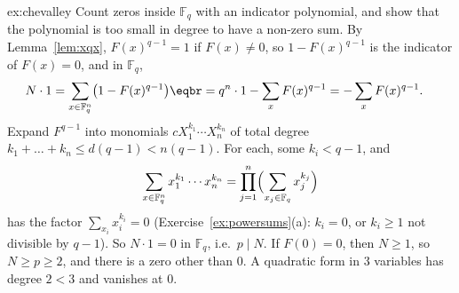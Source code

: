 \begin{solution}{ex:chevalley}
\idea Count zeros inside $\mathbb F_q$ with an indicator polynomial, and show that the polynomial is too small in degree to have a non-zero sum.
\writeup By Lemma~\ref{lem:xqx}, $F(x)^{q-1}=1$ if $F(x)\ne0$, so $1-F(x)^{q-1}$ is the indicator of $F(x)=0$, and in $\mathbb F_q$,
\[
\begin{aligned}N\cdot1&=\sum_{x\in\mathbb F_q^n}\bigl(1-F(x)^{q-1}\bigr)\eqbr=q^n\cdot1-\sum_{x}F(x)^{q-1}=-\sum_xF(x)^{q-1}.\end{aligned}
\]
Expand $F^{q-1}$ into monomials $cX_1^{k_1}\cdots X_n^{k_n}$ of total degree $k_1+\dots+k_n\le d(q-1)<n(q-1)$. For each, some $k_i<q-1$, and
\[
\sum_{x\in\mathbb F_q^n}x_1^{k_1}\cdots x_n^{k_n}=\prod_{j=1}^n\Bigl(\sum_{x_j\in\mathbb F_q}x_j^{k_j}\Bigr)
\]
has the factor $\sum_{x_i}x_i^{k_i}=0$ (Exercise~\ref{ex:powersums}(a): $k_i=0$, or $k_i\ge1$ not divisible by $q-1$). So $N\cdot1=0$ in $\mathbb F_q$, i.e.\ $p\mid N$. If $F(0)=0$, then $N\ge1$, so $N\ge p\ge2$, and there is a zero other than $0$. A quadratic form in $3$ variables has degree $2<3$ and vanishes at $0$.
\end{solution}

